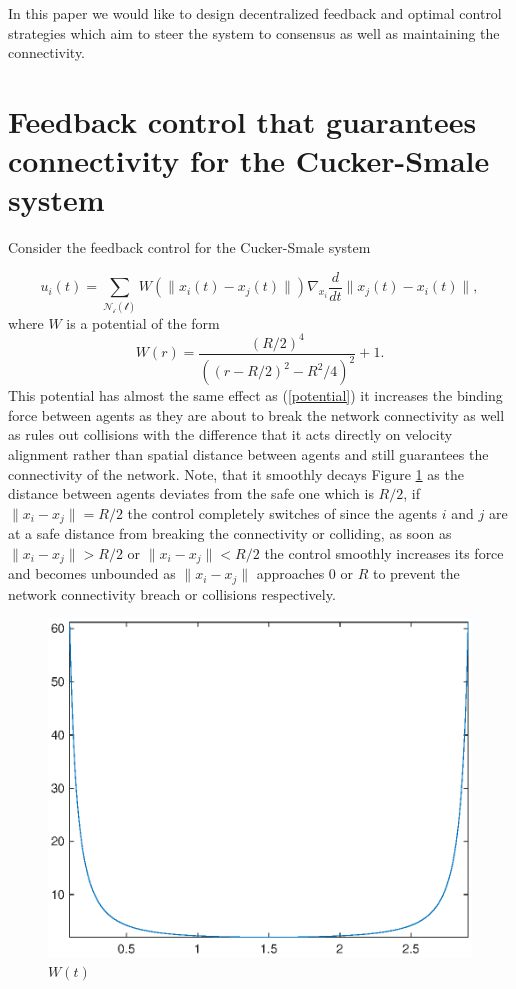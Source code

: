 \documentclass[a4paper,10pt, english]{article}
\begin{document}
In this paper we would like to design decentralized feedback and optimal control strategies which aim to steer the system to consensus as well as maintaining the connectivity.





\newpage
\section{Feedback control that guarantees connectivity for the Cucker-Smale system}
Consider the feedback control for the Cucker-Smale system 

\begin{equation}
u_i(t) = \sum_{\mathcal{N_{i}(t)}}W(\|x_i(t) - x_j(t)\|) \nabla_{x_i} \frac{d}{dt}\|x_j(t) - x_i(t)\|,
\label{myhc}
\end{equation}
where $W$ is a potential of the form
\begin{equation}
 W(r) = \frac{(R/2)^4}{((r - R/2)^2  - R^2/4)^2} + 1.
\label{potentialw}
\end{equation}
This potential has almost the same effect as (\ref{potential}) it increases the binding force between agents as they are about to break the network connectivity as well as rules out collisions with the difference that it acts directly on velocity alignment rather than spatial distance between agents and still guarantees the connectivity of the network. Note, that it smoothly decays Figure \ref{potentialwplot} as the distance between agents deviates from the safe one which is $R/2$, if $\|x_i - x_j\| = R/2$ the control completely switches of since the agents $i$ and $j$ are at a safe distance from breaking the connectivity or colliding, 
as soon as  $\|x_i - x_j\| > R/2$ or $\|x_i - x_j\| < R/2$ the control smoothly increases its force and becomes unbounded as $\|x_i - x_j\|$ approaches $0$ or $R$ to prevent the network connectivity breach or collisions respectively. 
\begin{figure}[ht]
 \centering
 \includegraphics[scale=0.5]{figures/potentialwplot.eps}
 \caption{$W(t)$}
 \label{potentialwplot}
\end{figure}
\end{document}

